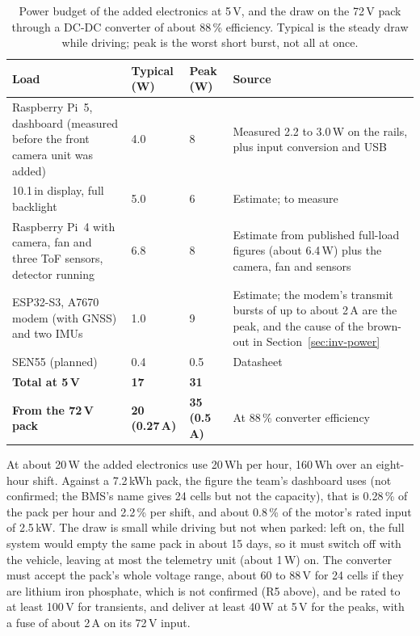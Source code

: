 \begin{table}[htbp]
\centering
\small
\caption[Power budget of the added electronics at 5\,V, and the draw on the 72\,V pack through a DC-DC converter of about 88\,\% efficiency]{Power budget of the added electronics at 5\,V, and the draw on the 72\,V pack through a DC-DC converter of about 88\,\% efficiency. Typical is the steady draw while driving; peak is the worst short burst, not all at once.}
\label{tab:power-budget}
\begin{tabular}{|p{5.6cm}|p{1.5cm}|p{1.3cm}|p{5.2cm}|}
\hline
\textbf{Load} & \textbf{Typical (W)} & \textbf{Peak (W)} & \textbf{Source} \\ \hline
Raspberry Pi~5, dashboard (measured before the front camera unit was added) & 4.0 & 8 & Measured 2.2 to 3.0\,W on the rails, plus input conversion and USB \\ \hline
10.1\,in display, full backlight & 5.0 & 6 & Estimate; to measure \\ \hline
Raspberry Pi~4 with camera, fan and three ToF sensors, detector running & 6.8 & 8 & Estimate from published full-load figures (about 6.4\,W) plus the camera, fan and sensors \\ \hline
ESP32-S3, A7670 modem (with GNSS) and two IMUs & 1.0 & 9 & Estimate; the modem's transmit bursts of up to about 2\,A are the peak, and the cause of the brown-out in Section~\ref{sec:inv-power} \\ \hline
SEN55 (planned) & 0.4 & 0.5 & Datasheet \\ \hline
\textbf{Total at 5\,V} & \textbf{17} & \textbf{31} & \\ \hline
\textbf{From the 72\,V pack} & \textbf{20 (0.27\,A)} & \textbf{35 (0.5\,A)} & At 88\,\% converter efficiency \\ \hline
\end{tabular}
\end{table}

At about 20\,W the added electronics use 20\,Wh per hour, 160\,Wh over an eight-hour shift. Against a 7.2\,kWh pack, the figure the team's dashboard uses (not confirmed; the BMS's name gives 24 cells but not the capacity), that is 0.28\,\% of the pack per hour and 2.2\,\% per shift, and about 0.8\,\% of the motor's rated input of 2.5\,kW. The draw is small while driving but not when parked: left on, the full system would empty the same pack in about 15 days, so it must switch off with the vehicle, leaving at most the telemetry unit (about 1\,W) on. The converter must accept the pack's whole voltage range, about 60 to 88\,V for 24 cells if they are lithium iron phosphate, which is not confirmed (R5 above), and be rated to at least 100\,V for transients, and deliver at least 40\,W at 5\,V for the peaks, with a fuse of about 2\,A on its 72\,V input.

